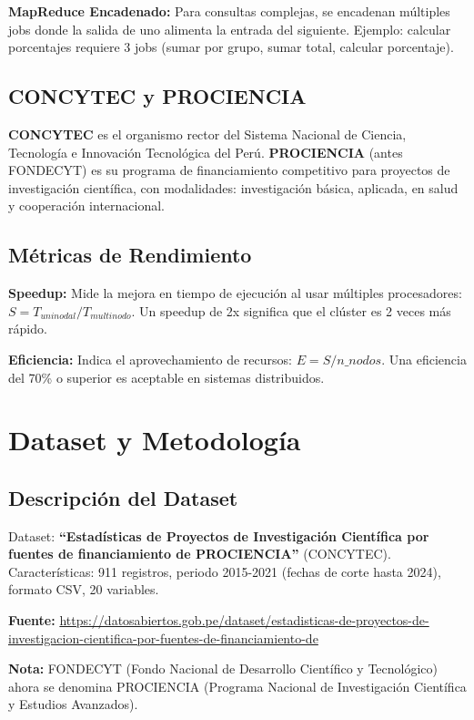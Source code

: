 \documentclass[12pt,a4paper]{article}
\begin{document}
\textbf{MapReduce Encadenado:} Para consultas complejas, se encadenan múltiples jobs donde la salida de uno alimenta la entrada del siguiente. Ejemplo: calcular porcentajes requiere 3 jobs (sumar por grupo, sumar total, calcular porcentaje).

\subsection{CONCYTEC y PROCIENCIA}

\textbf{CONCYTEC} es el organismo rector del Sistema Nacional de Ciencia, Tecnología e Innovación Tecnológica del Perú. \textbf{PROCIENCIA} (antes FONDECYT) es su programa de financiamiento competitivo para proyectos de investigación científica, con modalidades: investigación básica, aplicada, en salud y cooperación internacional.

\subsection{Métricas de Rendimiento}

\textbf{Speedup:} Mide la mejora en tiempo de ejecución al usar múltiples procesadores: $S = T_{uninodal} / T_{multinodo}$. Un speedup de 2x significa que el clúster es 2 veces más rápido.

\textbf{Eficiencia:} Indica el aprovechamiento de recursos: $E = S / n\_nodos$. Una eficiencia del 70\% o superior es aceptable en sistemas distribuidos.

\section{Dataset y Metodología}

\subsection{Descripción del Dataset}

Dataset: \textbf{``Estadísticas de Proyectos de Investigación Científica por fuentes de financiamiento de PROCIENCIA''} (CONCYTEC). Características: 911 registros, periodo 2015-2021 (fechas de corte hasta 2024), formato CSV, 20 variables.

\textbf{Fuente:} \url{https://datosabiertos.gob.pe/dataset/estadisticas-de-proyectos-de-investigacion-cientifica-por-fuentes-de-financiamiento-de}

\textbf{Nota:} FONDECYT (Fondo Nacional de Desarrollo Científico y Tecnológico) ahora se denomina PROCIENCIA (Programa Nacional de Investigación Científica y Estudios Avanzados).
\end{document}
